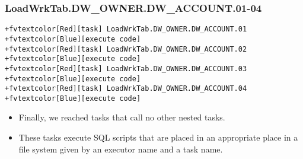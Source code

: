 \documentclass[english,xcolor={dvipsnames}]{beamer}
\begin{document}
\begin{frame}[fragile]
\frametitle{LoadWrkTab.DW\_OWNER.DW\_ACCOUNT.01-04}
\begin{Verbatim}[commandchars=+\[\]]
+fvtextcolor[Red][task] LoadWrkTab.DW_OWNER.DW_ACCOUNT.01 +fvtextcolor[Blue][execute code]
+fvtextcolor[Red][task] LoadWrkTab.DW_OWNER.DW_ACCOUNT.02 +fvtextcolor[Blue][execute code]
+fvtextcolor[Red][task] LoadWrkTab.DW_OWNER.DW_ACCOUNT.03 +fvtextcolor[Blue][execute code]
+fvtextcolor[Red][task] LoadWrkTab.DW_OWNER.DW_ACCOUNT.04 +fvtextcolor[Blue][execute code]
\end{Verbatim}
\begin{itemize}
    \item Finally, we reached tasks that call no other nested tasks.
    \item These tasks execute SQL scripts that are placed in an appropriate place in a file system given by an executor name and a task name.
\end{itemize}
\end{frame}
\end{document}
